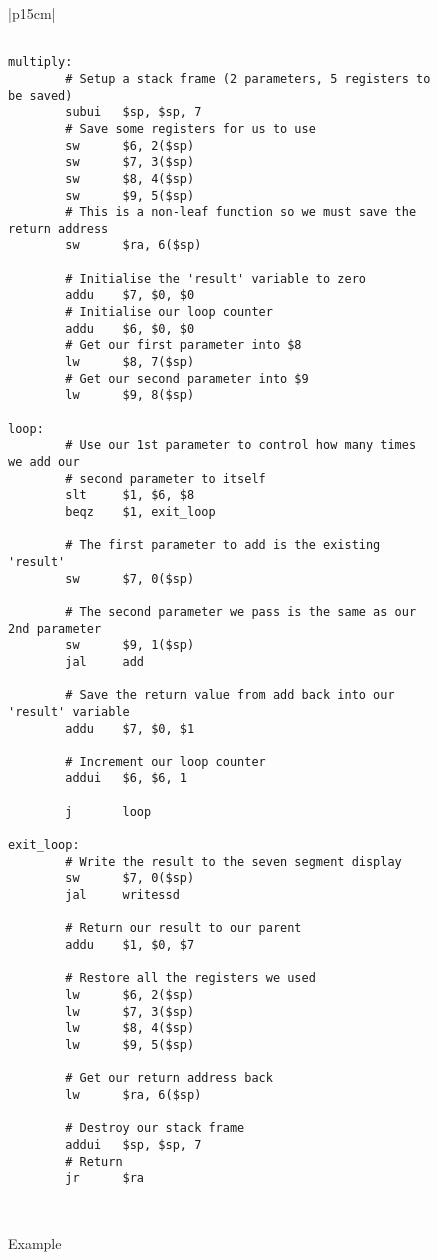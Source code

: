 





%
%
\begin{figure}[!hbtp]
\begin{footnotesize}
\begin{center}
\begin{tabular}{|p{15cm}|}
\hline
\begin{verbatim}

multiply:
        # Setup a stack frame (2 parameters, 5 registers to be saved)
        subui   $sp, $sp, 7
        # Save some registers for us to use
        sw      $6, 2($sp)
        sw      $7, 3($sp)
        sw      $8, 4($sp)
        sw      $9, 5($sp)
        # This is a non-leaf function so we must save the return address
        sw      $ra, 6($sp)

        # Initialise the 'result' variable to zero
        addu    $7, $0, $0
        # Initialise our loop counter
        addu    $6, $0, $0
        # Get our first parameter into $8
        lw      $8, 7($sp)
        # Get our second parameter into $9
        lw      $9, 8($sp)

loop:
        # Use our 1st parameter to control how many times we add our
        # second parameter to itself
        slt     $1, $6, $8
        beqz    $1, exit_loop

        # The first parameter to add is the existing 'result'
        sw      $7, 0($sp)

        # The second parameter we pass is the same as our 2nd parameter
        sw      $9, 1($sp)
        jal     add

        # Save the return value from add back into our 'result' variable
        addu    $7, $0, $1

        # Increment our loop counter
        addui   $6, $6, 1

        j       loop

exit_loop:
        # Write the result to the seven segment display
        sw      $7, 0($sp)
        jal     writessd

        # Return our result to our parent
        addu    $1, $0, $7

        # Restore all the registers we used
        lw      $6, 2($sp)
        lw      $7, 3($sp)
        lw      $8, 4($sp)
        lw      $9, 5($sp)

        # Get our return address back
        lw      $ra, 6($sp)

        # Destroy our stack frame
        addui   $sp, $sp, 7
        # Return
        jr      $ra

\end{verbatim}
\\
\hline
\end{tabular}
\end{center}
\end{footnotesize}

\caption{Example}
\label{stack_example}
\end{figure}
